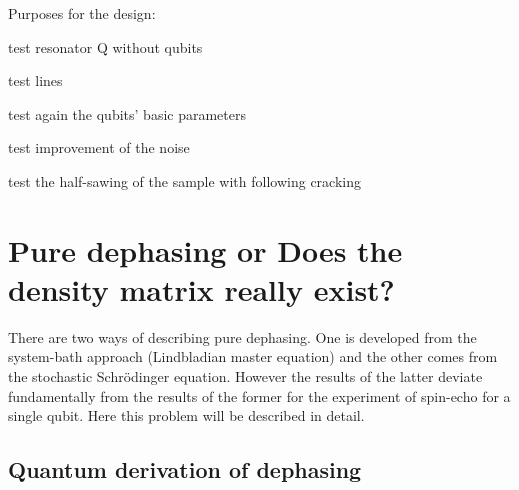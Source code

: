\documentclass[12pt, twoside]{report}
\numberwithin{equation}{section}
\begin{document}
Purposes for the design:

test resonator Q without qubits

test lines

test again the qubits' basic parameters

test improvement of the noise

test the half-sawing of the sample with following cracking



\appendix

\chapter{Pure dephasing or Does the density matrix really exist?}

There are two ways of describing pure dephasing. One is developed from the system-bath approach (Lindbladian master equation) and the other comes from the stochastic Schrödinger equation. However the results of the latter deviate fundamentally from the results of the former for the experiment of spin-echo for a single qubit. Here this problem will be described in detail.

\section{Quantum derivation of dephasing}
\end{document}
